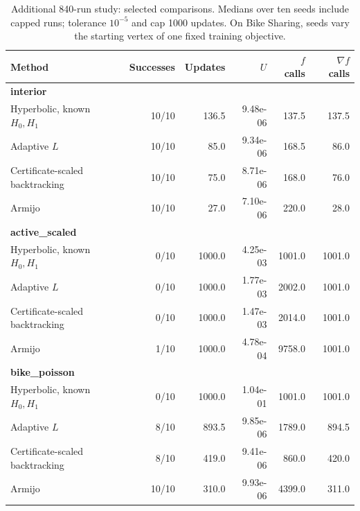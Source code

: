 \begin{table}[htbp]
\centering\small
\caption{Additional 840-run study: selected comparisons. Medians over ten seeds include capped runs; tolerance $10^{-5}$ and cap 1000 updates. On Bike Sharing, seeds vary the starting vertex of one fixed training objective.}
\label{tab:adaptive}
\begin{tabular}{lrrrrr}
\hline
Method & Successes & Updates & $U$ & $f$ calls & $\nabla f$ calls \\
\hline
\multicolumn{6}{l}{\textbf{interior}} \\
Hyperbolic, known $H_0,H_1$ & 10/10 & 136.5 & 9.48e-06 & 137.5 & 137.5 \\
Adaptive $L$ & 10/10 & 85.0 & 9.34e-06 & 168.5 & 86.0 \\
Certificate-scaled backtracking & 10/10 & 75.0 & 8.71e-06 & 168.0 & 76.0 \\
Armijo & 10/10 & 27.0 & 7.10e-06 & 220.0 & 28.0 \\
\hline
\multicolumn{6}{l}{\textbf{active\_scaled}} \\
Hyperbolic, known $H_0,H_1$ & 0/10 & 1000.0 & 4.25e-03 & 1001.0 & 1001.0 \\
Adaptive $L$ & 0/10 & 1000.0 & 1.77e-03 & 2002.0 & 1001.0 \\
Certificate-scaled backtracking & 0/10 & 1000.0 & 1.47e-03 & 2014.0 & 1001.0 \\
Armijo & 1/10 & 1000.0 & 4.78e-04 & 9758.0 & 1001.0 \\
\hline
\multicolumn{6}{l}{\textbf{bike\_poisson}} \\
Hyperbolic, known $H_0,H_1$ & 0/10 & 1000.0 & 1.04e-01 & 1001.0 & 1001.0 \\
Adaptive $L$ & 8/10 & 893.5 & 9.85e-06 & 1789.0 & 894.5 \\
Certificate-scaled backtracking & 8/10 & 419.0 & 9.41e-06 & 860.0 & 420.0 \\
Armijo & 10/10 & 310.0 & 9.93e-06 & 4399.0 & 311.0 \\
\hline
\end{tabular}
\end{table}
